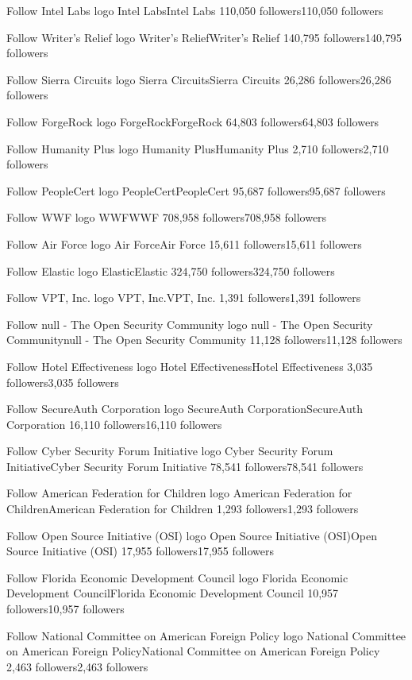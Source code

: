 Follow
Intel Labs logo
Intel LabsIntel Labs
110,050 followers110,050 followers

Follow
Writer's Relief logo
Writer's ReliefWriter's Relief
140,795 followers140,795 followers

Follow
Sierra Circuits logo
Sierra CircuitsSierra Circuits
26,286 followers26,286 followers

Follow
ForgeRock logo
ForgeRockForgeRock
64,803 followers64,803 followers

Follow
Humanity Plus logo
Humanity PlusHumanity Plus
2,710 followers2,710 followers

Follow
PeopleCert logo
PeopleCertPeopleCert
95,687 followers95,687 followers

Follow
WWF logo
WWFWWF
708,958 followers708,958 followers

Follow
Air Force logo
Air ForceAir Force
15,611 followers15,611 followers

Follow
Elastic logo
ElasticElastic
324,750 followers324,750 followers

Follow
VPT, Inc. logo
VPT, Inc.VPT, Inc.
1,391 followers1,391 followers

Follow
null - The Open Security Community logo
null - The Open Security Communitynull - The Open Security Community
11,128 followers11,128 followers

Follow
Hotel Effectiveness logo
Hotel EffectivenessHotel Effectiveness
3,035 followers3,035 followers

Follow
SecureAuth Corporation logo
SecureAuth CorporationSecureAuth Corporation
16,110 followers16,110 followers

Follow
Cyber Security Forum Initiative logo
Cyber Security Forum InitiativeCyber Security Forum Initiative
78,541 followers78,541 followers

Follow
American Federation for Children logo
American Federation for ChildrenAmerican Federation for Children
1,293 followers1,293 followers

Follow
Open Source Initiative (OSI) logo
Open Source Initiative (OSI)Open Source Initiative (OSI)
17,955 followers17,955 followers

Follow
Florida Economic Development Council logo
Florida Economic Development CouncilFlorida Economic Development Council
10,957 followers10,957 followers

Follow
National Committee on American Foreign Policy logo
National Committee on American Foreign PolicyNational Committee on American Foreign Policy
2,463 followers2,463 followers

